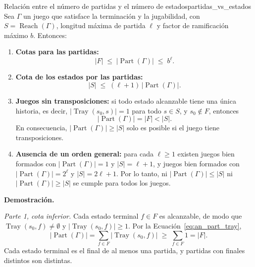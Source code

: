 \begin{teorema}{Relación entre el número de partidas y el número de estados}{partidas_vs_estados}
Sea $\Gamma$ un juego que satisface la terminación y la jugabilidad, con $S = \operatorname{Reach}(\Gamma)$, longitud máxima de partida $\ell$ y factor de ramificación máximo $b$. Entonces:
\begin{enumerate}
    \item \textbf{Cotas para las partidas:}
    \begin{equation}
        |F| \;\le\; |\operatorname{Part}(\Gamma)| \;\le\; b^{\ell}.
        \label{eq:an_teo_cotas_part}
    \end{equation}
    \item \textbf{Cota de los estados por las partidas:}
    \begin{equation}
        |S| \;\le\; (\ell + 1)\, |\operatorname{Part}(\Gamma)|.
        \label{eq:an_teo_cota_estados}
    \end{equation}
    \item \textbf{Juegos sin transposiciones:} si todo estado alcanzable tiene una única historia, es decir, $|\operatorname{Tray}(s_0, s)| = 1$ para todo $s \in S$, y $s_0 \notin F$, entonces
    \begin{equation}
        |\operatorname{Part}(\Gamma)| = |F| < |S|.
        \label{eq:an_teo_arbol}
    \end{equation}
    En consecuencia, $|\operatorname{Part}(\Gamma)| \ge |S|$ solo es posible si el juego tiene transposiciones.
    \item \textbf{Ausencia de un orden general:} para cada $\ell \ge 1$ existen juegos bien formados con $|\operatorname{Part}(\Gamma)| = 1$ y $|S| = \ell + 1$, y juegos bien formados con $|\operatorname{Part}(\Gamma)| = 2^{\ell}$ y $|S| = 2\ell + 1$. Por lo tanto, ni $|\operatorname{Part}(\Gamma)| \le |S|$ ni $|\operatorname{Part}(\Gamma)| \ge |S|$ se cumple para todos los juegos.
\end{enumerate}
\end{teorema}

\noindent\textbf{Demostración.}

\emph{Parte 1, cota inferior.} Cada estado terminal $f \in F$ es alcanzable, de modo que $\operatorname{Tray}(s_0, f) \neq \emptyset$ y $|\operatorname{Tray}(s_0, f)| \ge 1$. Por la Ecuación~\eqref{eq:an_part_tray},
\begin{equation*}
    |\operatorname{Part}(\Gamma)| = \sum_{f \in F} |\operatorname{Tray}(s_0, f)| \;\ge\; \sum_{f \in F} 1 = |F|.
\end{equation*}
Cada estado terminal es el final de al menos una partida, y partidas con finales distintos son distintas.

